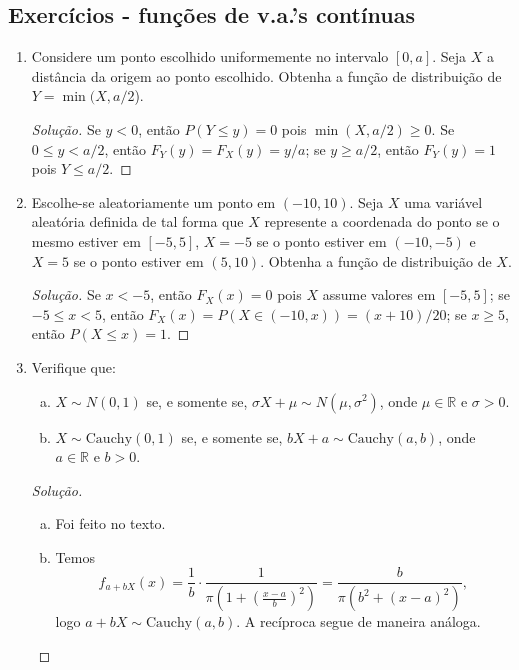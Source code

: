 \documentclass[../Notas.tex]{subfiles}
\begin{document}
\subsection{Exercícios - funções de v.a.'s contínuas}

\begin{enumerate}
    \item Considere um ponto escolhido uniformemente no intervalo $[0, a]$. Seja $X$ a distância da origem ao ponto escolhido. Obtenha a função de distribuição de $Y = \min(X, a/2$).
    \begin{proof}[Solução]
        Se $y<0$, então $P(Y\leq y) = 0$ pois $\min(X, a/2)\geq 0$. Se $0\leq y<a/2$, então
        $F_Y(y) = F_X(y) = y/a$; se $y\geq a/2$, então $F_Y(y) = 1$ pois $Y\leq a/2$.
    \end{proof}
    \item Escolhe-se aleatoriamente um ponto em $(-10, 10)$. Seja $X$ uma variável aleatória definida de tal forma que $X$ represente a coordenada do ponto se o mesmo estiver em $[-5, 5]$, $X = -5$ se o ponto estiver em $(-10, -5)$ e $X = 5$ se o ponto estiver em $(5, 10)$. Obtenha a função de distribuição de $X$.
    \begin{proof}[Solução]
        Se $x<-5$, então $F_X(x) = 0$ pois $X$ assume valores em $[-5,5]$; se $-5\leq x<5$, então
        $F_X(x) = P(X\in(-10,x)) = (x+10)/20$; se $x\geq 5$, então $P(X\leq x) = 1$.
    \end{proof}
    \item Verifique que:
    \begin{enumerate}[a)]
    \item $X\sim N(0,1)$ se, e somente se, $\sigma X + \mu \sim N(\mu, \sigma^2)$, onde $\mu \in \mathbb{R}$ e $\sigma > 0$.
    \item $X\sim\text{Cauchy}(0, 1)$ se, e somente se, $bX + a \sim \text{Cauchy}(a, b)$, onde $a\in\mathbb{R}$ e $b > 0$.
    \end{enumerate}
    \begin{proof}[Solução]
        \begin{enumerate}[a)]
            \item Foi feito no texto.
            \item Temos
            \[
            f_{a+bX}(x) = \frac{1}{b}\cdot\frac{1}{\pi(1 + (\frac{x-a}{b})^2)} 
                        = \frac{b}{\pi(b^2 + (x-a)^2)},
            \]
            logo $a+bX\sim\text{Cauchy}(a,b)$. A recíproca segue de maneira análoga.

\end{enumerate}
\end{proof}
\end{enumerate}
\end{document}
